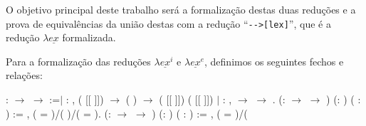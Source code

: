 O objetivo principal deste trabalho será a formalização destas duas reduções e a
prova de equivalências da união destas com a redução ``\texttt{-{}->[lex]}'', que é a
redução $\lambda \underline{ex}$ formalizada.

Para a formalização das reduções $\lambda \underline{ex}^i$ e $\lambda
\underline{ex}^e$, definimos os seguintes fechos e relações:


\bigskip

\coqdocnoindent{} : 
\ensuremath{\rightarrow}  \ensuremath{\rightarrow}
 :=\coqdoceol \coqdocnoindent \ensuremath{|}
: \coqdockw{\ensuremath{\forall}}
  , \coqdoceol \coqdocindent{11.50em}
 ( [[  ]])
\ensuremath{\rightarrow}\coqdoceol \coqdocindent{11.50em} (
 ) \ensuremath{\rightarrow}\coqdoceol
\coqdocindent{11.50em}  ( [[ 
]]) ( [[  ]])\coqdoceol \coqdocnoindent
\ensuremath{|}  : \coqdockw{\ensuremath{\forall}}
 , \coqdoceol \coqdocindent{8.00em}
  \ensuremath{\rightarrow}\coqdoceol
\coqdocindent{8.00em}   
\ensuremath{\rightarrow} \coqdoceol \coqdocindent{8.00em} 
 .\coqdoceol \coqdocemptyline \coqdocnoindent
{}  (:
 \ensuremath{\rightarrow} 
\ensuremath{\rightarrow} ) (: )
( : ) := \coqdoceol \coqdocindent{4.00em}
\coqdoctac{\ensuremath{\exists}}  , (
= )/(
  )/(
= ).\coqdoceol \coqdocemptyline \coqdocnoindent
{}  (:
 \ensuremath{\rightarrow} 
\ensuremath{\rightarrow} ) (: )
( : ) := \coqdoceol \coqdocindent{2.00em}
\coqdoctac{\ensuremath{\exists}}  , (
=
)/(
